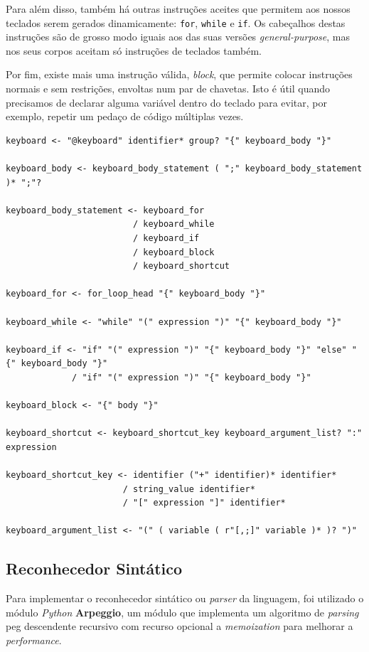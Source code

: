 Para além disso, também há outras instruções aceites que permitem aos nossos teclados serem gerados dinamicamente: \texttt{for}, \texttt{while} e \texttt{if}. Os cabeçalhos destas instruções são de grosso modo iguais aos das suas versões \textit{general-purpose}, mas nos seus corpos aceitam só instruções de teclados também.

Por fim, existe mais uma instrução válida, \textit{block}, que permite colocar instruções normais e sem restrições, envoltas num par de chavetas. Isto é útil quando precisamos de declarar alguma variável dentro do teclado para evitar, por exemplo, repetir um pedaço de código múltiplas vezes.

\begin{lstlisting}[caption={Produções associadas a teclados na gramática},language={}]
keyboard <- "@keyboard" identifier* group? "{" keyboard_body "}"

keyboard_body <- keyboard_body_statement ( ";" keyboard_body_statement )* ";"?

keyboard_body_statement <- keyboard_for
                         / keyboard_while
                         / keyboard_if
                         / keyboard_block
                         / keyboard_shortcut

keyboard_for <- for_loop_head "{" keyboard_body "}"

keyboard_while <- "while" "(" expression ")" "{" keyboard_body "}"

keyboard_if <- "if" "(" expression ")" "{" keyboard_body "}" "else" "{" keyboard_body "}"
             / "if" "(" expression ")" "{" keyboard_body "}"

keyboard_block <- "{" body "}"

keyboard_shortcut <- keyboard_shortcut_key keyboard_argument_list? ":" expression

keyboard_shortcut_key <- identifier ("+" identifier)* identifier*
                       / string_value identifier*
                       / "[" expression "]" identifier*

keyboard_argument_list <- "(" ( variable ( r"[,;]" variable )* )? ")"
\end{lstlisting}

\subsection{Reconhecedor Sintático}
Para implementar o reconhecedor sintático ou \textit{parser} da linguagem, foi utilizado o módulo \textit{Python} \textbf{Arpeggio}, um módulo que implementa um algoritmo de \textit{parsing} \acrshort{peg} descendente recursivo com recurso opcional a \textit{memoization} para melhorar a \textit{performance}.

